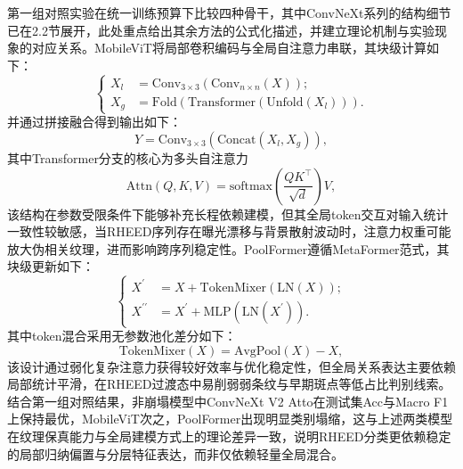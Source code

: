 第一组对照实验在统一训练预算下比较四种骨干，其中ConvNeXt系列的结构细节已在2.2节展开，此处重点给出其余方法的公式化描述，并建立理论机制与实验现象的对应关系。MobileViT将局部卷积编码与全局自注意力串联，其块级计算如下：
\begin{equation}
    \label{eq:cp2_mobilevit_block}
    \left\{
    \begin{aligned}
        X_l & =\mathrm{Conv}_{3\times 3}(\mathrm{Conv}_{n\times n}(X));   \\
        X_g & =\mathrm{Fold}(\mathrm{Transformer}(\mathrm{Unfold}(X_l))).
    \end{aligned}
    \right.
\end{equation}
并通过拼接融合得到输出如下：
\begin{equation}
    \label{eq:cp2_mobilevit_fuse}
    Y=\mathrm{Conv}_{3\times 3}(\mathrm{Concat}(X_l,X_g)),
\end{equation}
其中Transformer分支的核心为多头自注意力
\begin{equation}
    \label{eq:cp2_mobilevit_attn}
    \mathrm{Attn}(Q,K,V)=\mathrm{softmax}\left(\frac{QK^\top}{\sqrt{d}}\right)V,
\end{equation}
该结构在参数受限条件下能够补充长程依赖建模，但其全局token交互对输入统计一致性较敏感，当RHEED序列存在曝光漂移与背景散射波动时，注意力权重可能放大伪相关纹理，进而影响跨序列稳定性。PoolFormer遵循MetaFormer范式，其块级更新如下：
\begin{equation}
    \label{eq:cp2_poolformer_block}
    \left\{
    \begin{aligned}
        X^{\prime}       & =X+\mathrm{TokenMixer}(\mathrm{LN}(X));            \\
        X^{\prime\prime} & =X^{\prime}+\mathrm{MLP}(\mathrm{LN}(X^{\prime})).
    \end{aligned}
    \right.
\end{equation}
其中token混合采用无参数池化差分如下：
\begin{equation}
    \label{eq:cp2_poolformer_mix}
    \mathrm{TokenMixer}(X)=\mathrm{AvgPool}(X)-X,
\end{equation}
该设计通过弱化复杂注意力获得较好效率与优化稳定性，但全局关系表达主要依赖局部统计平滑，在RHEED过渡态中易削弱弱条纹与早期斑点等低占比判别线索。结合第一组对照结果，非崩塌模型中ConvNeXt V2 Atto在测试集Acc与Macro F1上保持最优，MobileViT次之，PoolFormer出现明显类别塌缩，这与上述两类模型在纹理保真能力与全局建模方式上的理论差异一致，说明RHEED分类更依赖稳定的局部归纳偏置与分层特征表达，而非仅依赖轻量全局混合。

